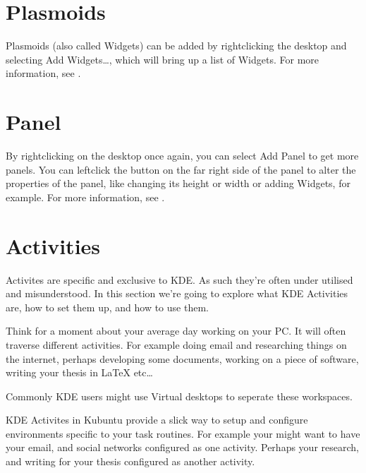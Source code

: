 \documentclass[letterpaper,10pt,english]{sphinxmanual}
\begin{document}
\section{Plasmoids}
\label{\detokenize{docs/advanced:plasmoids}}
\sphinxAtStartPar
Plasmoids (also called Widgets) can be added by right\sphinxhyphen{}clicking the desktop and selecting Add Widgets…, which will bring up a list of Widgets. For more information, see .


\section{Panel}
\label{\detokenize{docs/advanced:panel}}

\sphinxAtStartPar
By right\sphinxhyphen{}clicking on the desktop once again, you can select Add Panel to get more panels. You can left\sphinxhyphen{}click the button on the far right side of the panel to alter the properties of the panel, like changing its height or width or adding Widgets, for example. For more information, see .


\section{Activities}
\label{\detokenize{docs/advanced:activities}}
\sphinxAtStartPar
Activites are specific and exclusive to KDE. As such they’re often under utilised and misunderstood. In this section we’re going to explore what KDE Activities are, how to set them up, and how to use them.

\sphinxAtStartPar
Think for a moment about your average day working on your PC. It will often traverse different activities. For example doing email and researching things on the internet, perhaps developing some documents, working on a piece of software, writing your thesis in LaTeX etc…

\sphinxAtStartPar
Commonly KDE users might use Virtual desktops to seperate these workspaces.

\sphinxAtStartPar
KDE Activites in Kubuntu provide a slick way to setup and configure environments specific to your task routines. For example your might want to have your email, and social networks configured as one activity. Perhaps your research, and writing for your thesis configured as another activity.
\end{document}
